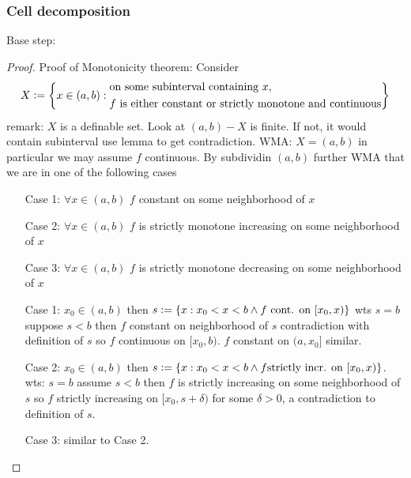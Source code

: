 \subsubsection{Cell decomposition}
Base step: 

\begin{proof}
    Proof of Monotonicity theorem:
    Consider 
    $$X \vcentcolon= \biggl\{x\in (a,b) : \begin{aligned}
        &\text{on some subinterval containing $x$,}\\
        &\text{$f$ is either constant or strictly monotone and continuous}
    \end{aligned} \biggr\}$$
    remark: $X$ is a definable set.
    Look at $(a,b)-X$ is finite. If not, it would contain subinterval use lemma to get contradiction.
    WMA: $X = (a,b)$ in particular we may assume $f$ continuous.
    By subdividin $(a,b)$ further WMA that we are in one of the following cases
    \begin{enumerate}
        \item[Case 1:] $\forall x \in (a,b)$ $f$ constant on some neighborhood of $x$
        \item[Case 2:] $\forall x \in (a,b)$ $f$ is strictly monotone increasing on some neighborhood 
        of $x$
        \item[Case 3:] $\forall x \in (a,b)$ $f$ is strictly monotone decreasing on some neighborhood 
        of $x$
    \end{enumerate}
    \begin{enumerate}
        \item[Case 1:] $x_0 \in (a,b)$ then 
        $s \vcentcolon= \{ x: x_0<x<b \land f \text{ cont. on $[x_0,x)$}\}$
        wts $s=b$ suppose $s<b$ then $f$ constant on neighborhood of $s$ contradiction with 
        definition of $s$ so $f$ continuous on $[x_0,b)$. $f$ constant on $(a,x_0]$ similar.
        \item[Case 2:] $x_0\in (a,b)$ then $s\vcentcolon= \{x: x_0<x<b \land f \text{strictly incr. on } 
        [x_0,x) \}$. wts: $s=b$ assume $s<b$ then $f$ is strictly increasing on some neighborhood of 
        $s$ so $f$ strictly increasing on $[x_0,s+\delta)$ for some $\delta>0$, a contradiction to 
        definition of $s$. 
        \item[Case 3:] similar to Case 2. 
    \end{enumerate}
\end{proof}
